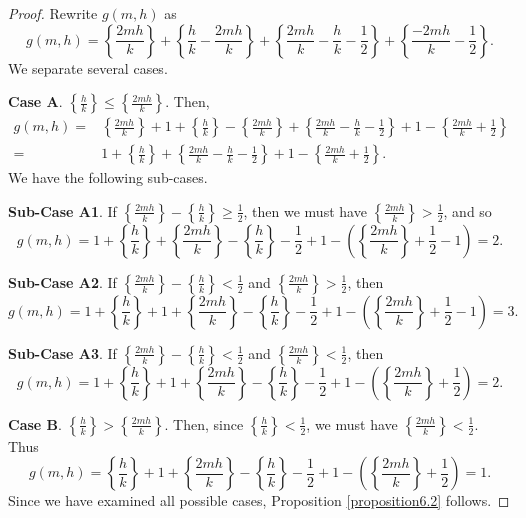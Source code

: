 \documentclass[11pt,reqno]{amsart}
\theoremstyle{plain}
\numberwithin{equation}{section}
\begin{document}
\begin{proof}
	Rewrite $g(m,h)$ as
 $$g(m,h)=\left\{\frac{2mh}{k}\right\}+\left\{\frac{h}{k}-\frac{2mh}{k}\right\}+\left\{\frac{2mh}{k}-\frac{h}{k}-\frac{1}{2}\right\}+\left\{\frac{-2mh}{k}-\frac{1}{2}\right\}.$$
	We separate several cases. \\
\medskip

\noindent	\textbf{Case A}. $\left\{\frac{h}{k}\right\}\leq \left\{\frac{2mh}{k}\right\}$.  Then,
 \begin{align*}
		g(m,h)=&\left\{\frac{2mh}{k}\right\}+1+\left\{\frac{h}{k}\right\}-\left\{\frac{2mh}{k}\right\}+\left\{\frac{2mh}{k}-\frac{h}{k}-\frac{1}{2}\right\}
+1-\left\{\frac{2mh}{k}+\frac{1}{2}\right\}\\\nonumber
		=&1+\left\{\frac{h}{k}\right\}+\left\{\frac{2mh}{k}-\frac{h}{k}-\frac{1}{2}\right\}+1-\left\{\frac{2mh}{k}+\frac{1}{2}\right\}.
	\end{align*}
	We have the following sub-cases.

\medskip
	
	\textbf{Sub-Case A1}. If $\left\{\frac{2mh}{k}\right\}-\left\{\frac{h}{k}\right\}\geq \frac{1}{2}$, then we must have $\left\{\frac{2mh}{k}\right\}>\frac{1}{2}$, and so
	$$g(m,h)=1+\left\{\frac{h}{k}\right\}+\left\{\frac{2mh}{k}\right\}-\left\{\frac{h}{k}\right\}-\frac{1}{2}+1-\left(\left\{\frac{2mh}{k}\right\}+\frac{1}{2}-1\right)=2.$$
	
	\textbf{Sub-Case A2}. If $\left\{\frac{2mh}{k}\right\}-\left\{\frac{h}{k}\right\}< \frac{1}{2}$ and $\left\{\frac{2mh}{k}\right\}>\frac{1}{2}$, then
	$$g(m,h)=1+\left\{\frac{h}{k}\right\}+1+\left\{\frac{2mh}{k}\right\}-\left\{\frac{h}{k}\right\}-\frac{1}{2}+1-\left(\left\{\frac{2mh}{k}\right\}+\frac{1}{2}-1\right)=3.$$
	
	\textbf{Sub-Case A3}. If $\left\{\frac{2mh}{k}\right\}-\left\{\frac{h}{k}\right\}< \frac{1}{2}$ and $\left\{\frac{2mh}{k}\right\}<\frac{1}{2}$, then
	$$g(m,h)=1+\left\{\frac{h}{k}\right\}+1+\left\{\frac{2mh}{k}\right\}-\left\{\frac{h}{k}\right\}-\frac{1}{2}+1-\left(\left\{\frac{2mh}{k}\right\}+\frac{1}{2}\right)=2.$$

\medskip\noindent
	 \textbf{Case B}. $\left\{\frac{h}{k}\right\}>\left\{\frac{2mh}{k}\right\}$. Then, since $\left\{\frac{h}{k}\right\}<\frac{1}{2}$, we must have $\left\{\frac{2mh}{k}\right\}<\frac{1}{2}$. Thus
 $$g(m,h)= \left\{\frac{h}{k}\right\}+1+\left\{\frac{2mh}{k}\right\}-\left\{\frac{h}{k}\right\}-\frac{1}{2}+1-\left(\left\{\frac{2mh}{k}\right\}+\frac{1}{2}\right)=1.$$
 Since we have examined all possible cases, Proposition \ref{proposition6.2} follows.
\end{proof}
\end{document}
